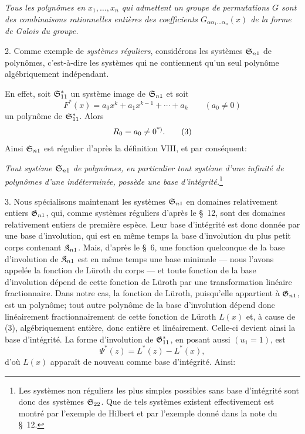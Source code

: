 \emph{Tous les polynômes en $x_1,\ldots,x_n$ qui admettent un groupe de permutations $G$ sont des combinaisons rationnelles entières des coefficients $G_{\alpha\alpha_1\ldots\alpha_n}(x)$ de la forme de Galois du groupe.}

2. Comme exemple de \emph{systèmes réguliers}, considérons les systèmes $\mathfrak{S}_{n1}$ de polynômes, c'est-à-dire les systèmes qui ne contiennent qu'un seul polynôme algébriquement indépendant.

En effet, soit $\mathfrak{S}^*_{11}$ un système image de $\mathfrak{S}_{n1}$ et soit
\[
  F^*(x)=a_0x^k+a_1x^{k-1}+\cdots+a_k\qquad(a_0\ne0)
\]
un polynôme de $\mathfrak{S}^*_{11}$. Alors
\begin{equation}
  R_0=a_0\ne0\srcfnmark{*)}.
\tag{3}
\end{equation}
Ainsi $\mathfrak{S}_{n1}$ est régulier d'après la définition VIII, et par conséquent:

\emph{Tout système $\mathfrak{S}_{n1}$ de polynômes, en particulier tout système d'une infinité de polynômes d'une indéterminée, possède une base d'intégrité.}\footnote{Les systèmes non réguliers les plus simples possibles sans base d'intégrité sont donc des systèmes $\mathfrak{S}_{22}$. Que de tels systèmes existent effectivement est montré par l'exemple de Hilbert et par l'exemple donné dans la note du \S\ 12.}

3. Nous spécialisons maintenant les systèmes $\mathfrak{S}_{n1}$ en domaines relativement entiers $\mathfrak{G}_{n1}$, qui, comme systèmes réguliers d'après le \S\ 12, sont des domaines relativement entiers de première espèce. Leur base d'intégrité est donc donnée par une base d'involution, qui est en même temps la base d'involution du plus petit corps contenant $\mathfrak{K}_{n1}$. Mais, d'après le \S\ 6, une fonction quelconque de la base d'involution de $\mathfrak{K}_{n1}$ est en même temps une base minimale --- nous l'avons appelée la fonction de Lüroth du corps --- et toute fonction de la base d'involution dépend de cette fonction de Lüroth par une transformation linéaire fractionnaire. Dans notre cas, la fonction de Lüroth, puisqu'elle appartient à $\mathfrak{G}_{n1}$, est un polynôme; tout autre polynôme de la base d'involution dépend donc linéairement fractionnairement de cette fonction de Lüroth $L(x)$ et, à cause de (3), algébriquement entière, donc entière et linéairement. Celle-ci devient ainsi la base d'intégrité. La forme d'involution de $\mathfrak{G}^*_{11}$, en posant aussi $(u_1=1)$, est
\[
  \Psi^*(z)=L^*(z)-L^*(x),
\]
d'où $L(x)$ apparaît de nouveau comme base d'intégrité. Ainsi:

